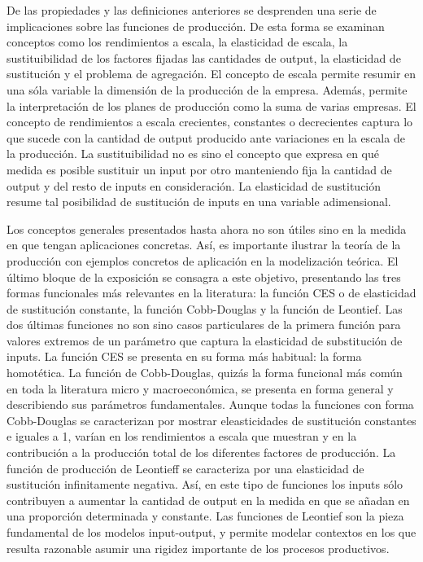 \documentclass{nuevotema}
\begin{document}
De las propiedades y las definiciones anteriores se desprenden una serie de implicaciones sobre las funciones de producción. De esta forma se examinan conceptos como los rendimientos a escala, la elasticidad de escala, la sustituibilidad de los factores fijadas las cantidades de output, la elasticidad de sustitución y el problema de agregación. El concepto de escala permite resumir en una sóla variable la dimensión de la producción de la empresa. Además, permite la interpretación de los planes de producción como la suma de varias empresas. El concepto de rendimientos a escala crecientes, constantes o decrecientes captura lo que sucede con la cantidad de output producido ante variaciones en la escala de la producción. La sustituibilidad no es sino el concepto que expresa en qué medida es posible sustituir un input por otro manteniendo fija la cantidad de output y del resto de inputs en consideración. La elasticidad de sustitución resume tal posibilidad de sustitución de inputs en una variable adimensional.

Los conceptos generales presentados hasta ahora no son útiles sino en la medida en que tengan aplicaciones concretas. Así, es importante ilustrar la teoría de la producción con ejemplos concretos de aplicación en la modelización teórica. El último bloque de la exposición se consagra a este objetivo, presentando las tres formas funcionales más relevantes en la literatura: la función CES o de elasticidad de sustitución constante, la función Cobb-Douglas y la función de Leontief. Las dos últimas funciones no son sino casos particulares de la primera función para valores extremos de un parámetro que captura la elasticidad de substitución de inputs. La función CES se presenta en su forma más habitual: la forma homotética. La función de Cobb-Douglas, quizás la forma funcional más común en toda la literatura micro y macroeconómica, se presenta en forma general y describiendo sus parámetros fundamentales. Aunque todas la funciones con forma Cobb-Douglas se caracterizan por mostrar eleasticidades de sustitución constantes e iguales a 1, varían en los rendimientos a escala que muestran y en la contribución a la producción total de los diferentes factores de producción. La función de producción de Leontieff se caracteriza por una elasticidad de sustitución infinitamente negativa. Así, en este tipo de funciones los inputs sólo contribuyen a aumentar la cantidad de output en la medida en que se añadan en una proporción determinada y constante. Las funciones de Leontief son la pieza fundamental de los modelos input-output, y permite modelar contextos en los que resulta razonable asumir una rigidez importante de los procesos productivos.
\end{document}
